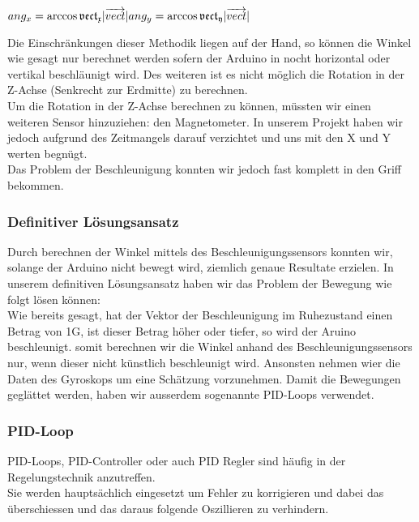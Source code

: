 \begin{math}
ang_x = \arccos{\frak{vect_x}{\lvert\overrightarrow{vect}\rvert}}
ang_y = \arccos{\frak{vect_y}{\lvert\overrightarrow{vect}\rvert}}
\end{math}

Die Einschränkungen dieser Methodik liegen auf der Hand, so können die Winkel wie gesagt nur berechnet werden sofern der Arduino in nocht horizontal oder vertikal beschläunigt wird.
Des weiteren ist es nicht möglich die Rotation in der Z-Achse (Senkrecht zur Erdmitte) zu berechnen.\\
Um die Rotation in der Z-Achse berechnen zu können, müssten wir einen weiteren Sensor hinzuziehen: den Magnetometer. 
In unserem Projekt haben wir jedoch aufgrund des Zeitmangels darauf verzichtet und uns mit den X und Y werten begnügt.\\
Das Problem der Beschleunigung konnten wir jedoch fast komplett in den Griff bekommen.

\subsubsection{Definitiver Lösungsansatz}
Durch berechnen der Winkel mittels des Beschleunigungssensors konnten wir, solange der Arduino nicht bewegt wird, ziemlich genaue Resultate erzielen.
In unserem definitiven Lösungsansatz haben wir das Problem der Bewegung wie folgt lösen können:\\
Wie bereits gesagt, hat der Vektor der Beschleunigung im Ruhezustand einen Betrag von 1G, ist dieser Betrag höher oder tiefer, so wird der Aruino beschleunigt.
somit berechnen wir die Winkel anhand des Beschleunigungssensors nur, wenn dieser nicht künstlich beschleunigt wird.
Ansonsten nehmen wier die Daten des Gyroskops um eine Schätzung vorzunehmen.
Damit die Bewegungen geglättet werden, haben wir ausserdem sogenannte PID-Loops verwendet.



\subsubsection{PID-Loop}
PID-Loops, PID-Controller oder auch PID Regler sind häufig in der Regelungstechnik anzutreffen.\\
Sie werden hauptsächlich eingesetzt um Fehler zu korrigieren und dabei das überschiessen und das daraus folgende Oszillieren zu verhindern.\\

